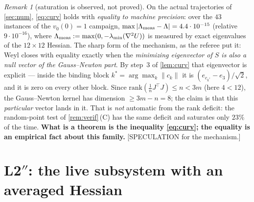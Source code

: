 \documentclass[11pt]{article}
\theoremstyle{remark}
\newtheorem{remark}[theorem]{Remark}
\begin{document}
\begin{remark}[saturation is observed, not proved]\label{rem:sat}
On the actual trajectories of \cref{sec:num}, \eqref{eq:curv} holds with
\emph{equality to machine precision}: over the $43$ instances of the
$v_0(0)=1$ campaign, $\max|\Lambda_{\rm meas}-\Lambda|=4.4\cdot10^{-15}$
(relative $9\cdot10^{-16}$), where
$\Lambda_{\rm meas}:=\max(0,-\lambda_{\min}(\nabla^2U))$ is measured by
exact eigenvalues of the $12\times12$ Hessian. The sharp form of the mechanism,
as the referee put it: Weyl closes with equality exactly when the
\emph{minimizing eigenvector of $S$ is also a null vector of the Gauss--Newton
part}. By step~3 of \cref{lem:curv} that eigenvector is explicit --- inside the
binding block $k^\ast=\arg\max_k\|c_k\|$ it is $(e_{c_{k^\ast}}-e_3)/\sqrt2$,
and it is zero on every other block. Since
$\mathrm{rank}(\tfrac1nJ^\top J)\le n<3m$ (here $4<12$), the Gauss--Newton
kernel has dimension $\ge3m-n=8$; the claim is that this \emph{particular}
vector lands in it. That is \emph{not} automatic from the rank deficit: the random-point test of
\cref{rem:verif}\,(C) has the same deficit and saturates only $23\%$ of the
time. \textbf{What is a theorem is the inequality \eqref{eq:curv}; the equality
is an empirical fact about this family.} [SPECULATION for the mechanism.]
\end{remark}

\section{\texorpdfstring{L2$''$}{L2''}: the live subsystem with an averaged Hessian}\label{sec:L2}
\end{document}
